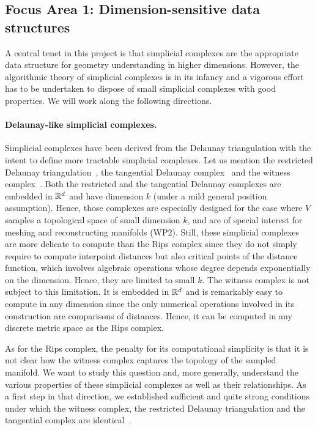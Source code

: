 \subsection*{Focus Area 1:  Dimension-sensitive data structures} 

A central tenet in this project is that simplicial complexes are the appropriate data structure for geometry understanding in higher dimensions. However,
the algorithmic theory of simplicial complexes is in its infancy and a vigorous effort has to be undertaken to dispose of small simplicial complexes with good properties.
We will work along the following directions.



\paragraph{Delaunay-like  simplicial complexes.} 
Simplicial complexes have been derived from the Delaunay triangulation with the intent to
define more tractable simplicial complexes. Let us mention the restricted Delaunay triangulation~\cite{he-gtmg-2001}, the tangential Delaunay complex~\cite{geometrica-7142i} and the witness complex~\cite{cds-tewc-2004}. Both the restricted and the tangential Delaunay complexes are embedded in $\mathbb R^d$ and have dimension $k$ (under a mild general position assumption).  Hence, those complexes are especially designed for the case where $V$ samples a topological space of small dimension $k$, and are of special interest for meshing and reconstructing manifolds (WP2).  Still, these simplicial complexes are more delicate to compute 
than the Rips complex since they do not simply require to compute interpoint distances but also  critical points of the distance function, which involves algebraic operations whose degree depends exponentially on the dimension. Hence, they are  limited to small $k$.
The witness complex is not subject to this limitation. It is embedded in $\mathbb R ^d$ and is remarkably easy to compute in any dimension since the only numerical operations involved in its construction are comparisons of distances. Hence, it can be computed in any discrete metric space as the Rips complex. 

As for the Rips complex, the penalty for its computational simplicity is that it is not clear how the witness complex captures the topology of the sampled manifold. 
We want to study this question and, more generally, understand the various properties of these simplicial complexes as well as their relationships. As a  first step in that direction, we established sufficient and quite strong conditions under which the witness complex, the restricted Delaunay triangulation and the tangential complex are identical~\cite{boissonnat2012stab}. 

